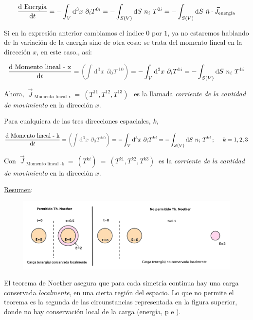 $$\displaystyle \displaystyle \dv{\text{ Energía}}{t}= -\int_V \dd^3 x \ \partial_i T^{0i} = - \int_{S(V)} \dd S \ n_i \ T^{0i} = -\int_{S(V)} \dd S \ \hat n \cdot \vec J_{\text{energía}}$$

Si en la expresión anterior cambiamos el índice $0$ por $1$, ya no estaremos hablando de la variación de la energía sino de otra cosa: se trata del momento lineal en la dirección $x$, en este caso., así:

$$\displaystyle \displaystyle \dv{\text{ Momento lineal - x}}{t}= \textcolor{gris}{ \left( \int \dd^3 x \ \partial_0 T^{10}  \right) } = 
-\int_V \dd^3 x \ \partial_i T^{1i} = - \int_{S(V)} \dd S \ n_i \ T^{1i} $$

Ahora, $\ \vec J_{ \text{ Momento lineal-x}} \ = \ (T^{11},T^{12},T^{13}) \ \ $ es la llamada \emph{corriente de la cantidad de movimiento} en la dirección $x$.

Para cualquiera de las tres direcciones espaciales, $k$,

$$\displaystyle \displaystyle \dv{\text{ Momento lineal - k}}{t}= \textcolor{gris}{ \left( \int \dd^3 x \ \partial_0 T^{k0}  \right) } = 
-\int_V \dd^3 x \ \partial_i T^{ki} = - \int_{S(V)} \dd S \ n_i \ T^{ki}\, ; \ \quad k=1,2,3$$

Con $ \ \vec J_{ \text{ Momento lineal -k}} \ = \ (T^{ki}) \ = \ (T^{k1},T^{k2},T^{k3}) \ $ es la \emph{corriente de la cantidad de movimiento} en la dirección $x$.


\vspace{5mm} \underline{Resumen}:


\begin{figure}[H]
	\centering
	\includegraphics[width=.95\textwidth]{imagenes/img34-05.png}
\end{figure}


El teorema de Noether asegura que para cada simetría continua hay una carga conservada \emph{localmente}, en una cierta región del espacio. Lo que no permite el teorema es la segunda de las circunstancias representada en la figura superior, donde no hay conservación local de la carga (energía, p e ).



